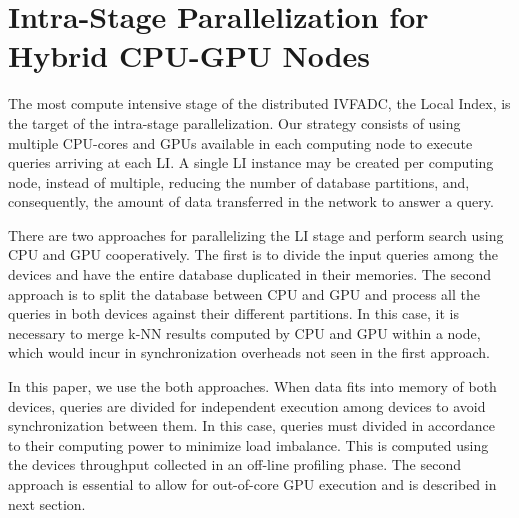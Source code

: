 \section{Intra-Stage Parallelization for Hybrid CPU-GPU Nodes}
\label{sec:intra-cooperative}

The most compute intensive stage of the distributed IVFADC, the Local Index, 
is the target of the intra-stage parallelization. Our strategy consists of using 
multiple CPU-cores and GPUs available in each computing node to execute queries 
arriving at each LI. A single LI instance may be created per computing node, 
instead of multiple, reducing the number of database partitions, and, consequently, 
the amount of data transferred in the network to answer a query.

There are two approaches for parallelizing the LI stage and perform search
using CPU and GPU cooperatively. The first is to divide the input queries 
among the devices and have the entire database duplicated in their memories. The second
approach is to split the database between CPU and GPU and process
all the queries in both devices against their different partitions. In 
this case, it is necessary to merge k-NN results computed by CPU and GPU within a node, which
would incur in synchronization overheads not seen in the first approach.

In this paper, we use the both approaches. When data fits into memory of both
devices, queries are divided for independent execution among devices to avoid 
synchronization between them. In this case,
queries must divided in accordance to their computing power to minimize 
load imbalance. This is computed using the devices throughput collected in an off-line 
profiling phase. The second approach is 
essential to allow for out-of-core GPU execution and
is described in next section.

%
%

